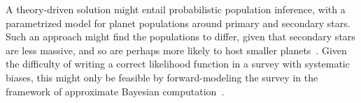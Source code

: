 \documentclass[12pt,modern]{aastex61}
\begin{document}
A theory-driven solution might entail probabilistic population
inference, with a parametrized model for planet populations around
primary and secondary stars.  Such an approach might find the
populations to differ, given that secondary stars are less
massive, and so are perhaps more likely to host smaller
planets~\citep{dressing_occurrence_2015}.  Given the difficulty of
writing a correct likelihood function in a survey with systematic
biases, this might only be feasible by forward-modeling the survey in
the framework of approximate Bayesian
computation~\citep[\textit{e.g.},][]{morehead_understanding_2016}.

\end{document}
